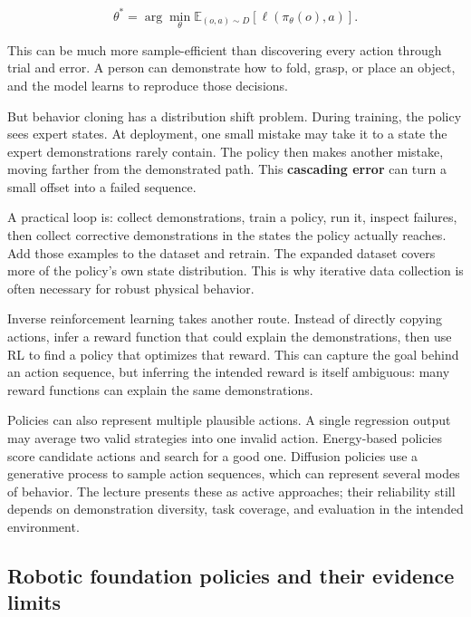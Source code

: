 \[
\theta^*=\arg\min_\theta\mathbb{E}_{(o,a)\sim D}\left[\ell(\pi_\theta(o),a)\right].
\]

This can be much more sample-efficient than discovering every action through trial and error. A person can demonstrate how to fold, grasp, or place an object, and the model learns to reproduce those decisions.

But behavior cloning has a distribution shift problem. During training, the policy sees expert states. At deployment, one small mistake may take it to a state the expert demonstrations rarely contain. The policy then makes another mistake, moving farther from the demonstrated path. This \textbf{cascading error} can turn a small offset into a failed sequence.

A practical loop is: collect demonstrations, train a policy, run it, inspect failures, then collect corrective demonstrations in the states the policy actually reaches. Add those examples to the dataset and retrain. The expanded dataset covers more of the policy's own state distribution. This is why iterative data collection is often necessary for robust physical behavior.

Inverse reinforcement learning takes another route. Instead of directly copying actions, infer a reward function that could explain the demonstrations, then use RL to find a policy that optimizes that reward. This can capture the goal behind an action sequence, but inferring the intended reward is itself ambiguous: many reward functions can explain the same demonstrations.

Policies can also represent multiple plausible actions. A single regression output may average two valid strategies into one invalid action. Energy-based policies score candidate actions and search for a good one. Diffusion policies use a generative process to sample action sequences, which can represent several modes of behavior. The lecture presents these as active approaches; their reliability still depends on demonstration diversity, task coverage, and evaluation in the intended environment.

\subsection{Robotic foundation policies and their evidence limits}\label{04-visual-computing-ii-ch034-robotic-foundation-policies-and-their-evidence-limits}

\hypertarget{04-visual-computing-ii-ch034-robotic-foundation-policies-and-their-evidence-limits}{}

